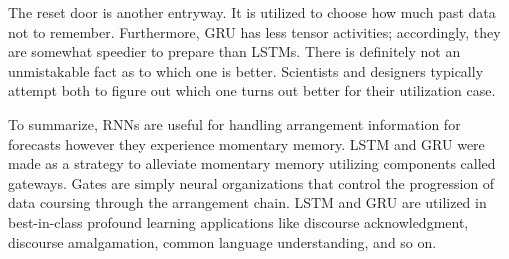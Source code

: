 The reset door is another entryway. It is utilized to choose how much past data not to remember. Furthermore, GRU has less tensor activities; accordingly, they are somewhat speedier to prepare than LSTMs. There is definitely not an unmistakable fact as to which one is better. Scientists and designers typically attempt both to figure out which one turns out better for their utilization case.  

To summarize, RNNs are useful for handling arrangement information for forecasts however they experience momentary memory. LSTM and GRU were made as a strategy to alleviate momentary memory utilizing components called gateways. Gates are simply neural organizations that control the progression of data coursing through the arrangement chain. LSTM and GRU are utilized in best-in-class profound learning applications like discourse acknowledgment, discourse amalgamation, common language understanding, and so on. 


